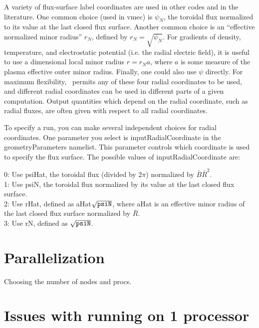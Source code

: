 A variety of flux-surface label coordinates are used in other codes and in the literature.
One common choice (used in {\ttfamily vmec}) is $\psi_N$, the toroidal flux normalized to its
value at the last closed flux surface.  Another common choice is an ``effective normalized minor radius''
$r_N$, defined by $r_N=\sqrt{\psi_N}$.  For gradients of density, temperature, and electrostatic potential (i.e. the radial
electric field), it is useful to use a dimensional local minor radius $r = r_N a$, where $a$ is some
measure of the plasma effective outer minor radius.  Finally, one could also use $\psi$ directly.
For maximum flexibility, \sfincs~permits any of these four radial coordinates to be used, and different radial
coordinates can be used in different parts of a given computation.  Output quantities which depend
on the radial coordinate, such as radial fluxes, are often given with respect to all radial coordinates.

To specify a run, you can make several independent choices for radial coordinates.  One parameter
you select is {\ttfamily inputRadialCoordinate} in the {\ttfamily geometryParameters} namelist.
This parameter controls which coordinate is used to specify the flux surface. The possible values of {\ttfamily inputRadialCoordinate} are:

0: Use {\ttfamily psiHat}, the toroidal flux (divided by $2\pi$) normalized by $\bar{B}\bar{R}^2$.\\

1: Use {\ttfamily psiN}, the toroidal flux normalized by its value at the last closed flux surface.\\

2: Use {\ttfamily rHat}, defined as {\ttfamily aHat}$\sqrt{\mbox{\ttfamily psiN}}$, where {\ttfamily aHat} is an effective minor radius of the last closed flux surface normalized by $\bar{R}$.\\

3: Use {\ttfamily rN}, defined as $\sqrt{\mbox{\ttfamily psiN}}$.\\





\section{Parallelization}
Choosing the number of nodes and procs.

\section{Issues with running on 1 processor}
